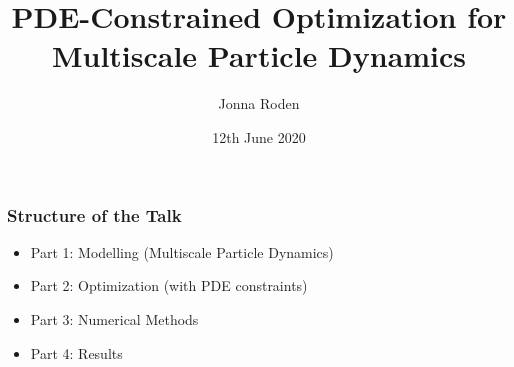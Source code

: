 \documentclass[aspectratio=169,xcolor=dvipsnames]{beamer}
\begin{document}
\title[]{PDE-Constrained Optimization for Multiscale Particle Dynamics}
\author[Jonna Roden]{Jonna Roden}
\date{12th June 2020}

\begin{frame}
\titlepage
\end{frame}
 
 
\begin{frame}
	\frametitle{Structure of the Talk}
	 
	 \begin{itemize}
	 	\item Part 1: Modelling (Multiscale Particle Dynamics)
	 	\item Part 2: Optimization (with PDE constraints)
	 	\item Part 3: Numerical Methods 
	 	\item Part 4: Results
	 \end{itemize}
\end{frame}
\end{document}
